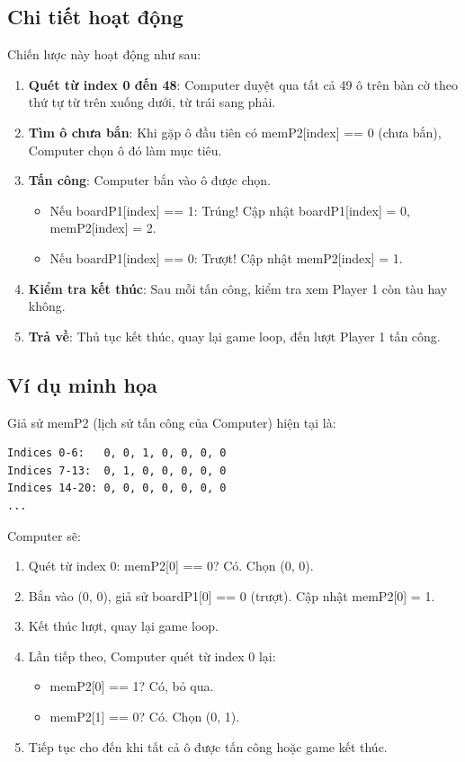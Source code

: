 \subsection{Chi tiết hoạt động}

Chiến lược này hoạt động như sau:

\begin{enumerate}
    \item \textbf{Quét từ index 0 đến 48}: Computer duyệt qua tất cả 49 ô trên bàn cờ theo thứ tự từ trên xuống dưới, từ trái sang phải.
    
    \item \textbf{Tìm ô chưa bắn}: Khi gặp ô đầu tiên có memP2[index] == 0 (chưa bắn), Computer chọn ô đó làm mục tiêu.
    
    \item \textbf{Tấn công}: Computer bắn vào ô được chọn.
    \begin{itemize}
        \item Nếu boardP1[index] == 1: Trúng! Cập nhật boardP1[index] = 0, memP2[index] = 2.
        \item Nếu boardP1[index] == 0: Trượt! Cập nhật memP2[index] = 1.
    \end{itemize}
    
    \item \textbf{Kiểm tra kết thúc}: Sau mỗi tấn công, kiểm tra xem Player 1 còn tàu hay không.
    
    \item \textbf{Trả về}: Thủ tục kết thúc, quay lại game loop, đến lượt Player 1 tấn công.
\end{enumerate}

\subsection{Ví dụ minh họa}

Giả sử memP2 (lịch sử tấn công của Computer) hiện tại là:

\begin{verbatim}
Indices 0-6:   0, 0, 1, 0, 0, 0, 0
Indices 7-13:  0, 1, 0, 0, 0, 0, 0
Indices 14-20: 0, 0, 0, 0, 0, 0, 0
...
\end{verbatim}

Computer sẽ:
\begin{enumerate}
    \item Quét từ index 0: memP2[0] == 0? Có. Chọn (0, 0).
    \item Bắn vào (0, 0), giả sử boardP1[0] == 0 (trượt). Cập nhật memP2[0] = 1.
    \item Kết thúc lượt, quay lại game loop.
    \item Lần tiếp theo, Computer quét từ index 0 lại:
    \begin{itemize}
        \item memP2[0] == 1? Có, bỏ qua.
        \item memP2[1] == 0? Có. Chọn (0, 1).
    \end{itemize}
    \item Tiếp tục cho đến khi tất cả ô được tấn công hoặc game kết thúc.
\end{enumerate}

